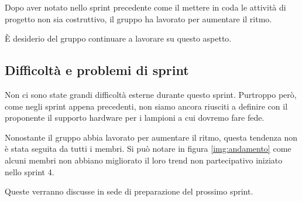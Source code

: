 Dopo aver notato nello sprint precedente come il mettere in coda le attività di progetto non sia costruttivo, il gruppo ha lavorato per aumentare il ritmo.

È desiderio del gruppo continuare a lavorare su questo aspetto.

\subsection{Difficoltà e problemi di sprint}

Non ci sono state grandi difficoltà esterne durante questo sprint. Purtroppo però, come negli sprint appena precedenti, non siamo ancora riusciti a definire con il proponente il supporto hardware per i lampioni a cui dovremo fare fede.

Nonostante il gruppo abbia lavorato per aumentare il ritmo, questa tendenza non è stata seguita da tutti i membri. Si può notare in figura \ref{img:andamento} come alcuni membri non abbiano migliorato il loro trend non partecipativo iniziato nello sprint 4.

Queste verranno discusse in sede di preparazione del prossimo sprint.
